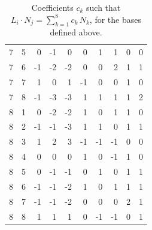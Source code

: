 \documentclass[twoside,english]{paper}
\numberwithin{equation}{section}
\numberwithin{figure}{section}
\theoremstyle{definition}
\theoremstyle{remark}
\begin{document}
\begin{table}[H]
\begin{minipage}[t]{0.48\textwidth}
\begin{tabular}{cc|rrrrrrrr}
7 & 5 & 0 & -1 & 0 & 0 & 1 & 1 & 0 & 0 \\
7 & 6 & -1 & -2 & -2 & 0 & 0 & 2 & 1 & 1 \\
7 & 7 & 1 & 0 & 1 & -1 & 0 & 0 & 1 & 0 \\
7 & 8 & -1 & -3 & -3 & 1 & 1 & 1 & 1 & 2 \\
\midrule
8 & 1 & 0 & -2 & -2 & 1 & 0 & 1 & 1 & 0 \\
8 & 2 & -1 & -1 & -3 & 1 & 1 & 0 & 1 & 1 \\
8 & 3 & 1 & 2 & 3 & -1 & -1 & -1 & 0 & 0 \\
8 & 4 & 0 & 0 & 0 & 1 & 0 & -1 & 1 & 0 \\
8 & 5 & 0 & -1 & -1 & 0 & 1 & 0 & 1 & 1 \\
8 & 6 & -1 & -1 & -2 & 1 & 0 & 1 & 1 & 1 \\
8 & 7 & -1 & -1 & -2 & 0 & 0 & 0 & 2 & 1 \\
8 & 8 & 1 & 1 & 1 & 0 & -1 & -1 & 0 & 1 \\
\bottomrule
\end{tabular}
\end{minipage}
\caption{Coefficients $c_k$ such that $L_i \cdot N_j = \sum_{k=1}^{8} c_k\, N_k$, for the bases defined above.}\label{tbl:appendix-LN}
\end{table}
\end{document}
